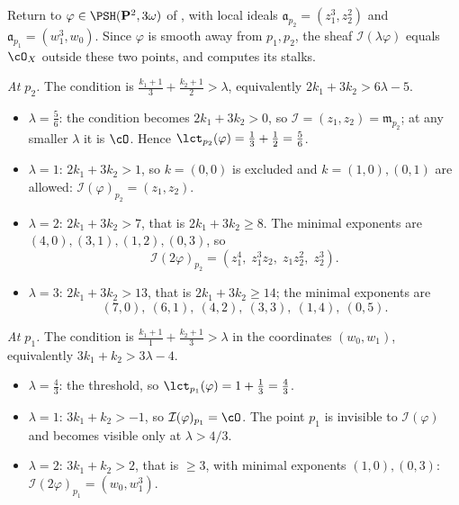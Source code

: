 \begin{example}
\label{ex:ch51-p2-ideals}
Return to \(\varphi\in\PSH(\mathbf P^2,3\omega)\) of
, with local ideals
\(\mathfrak a_{p_2}=(z_1^3,z_2^2)\) and
\(\mathfrak a_{p_1}=(w_1^3,w_0)\).  Since \(\varphi\) is smooth away from
\(p_1,p_2\), the sheaf \(\mathcal I(\lambda\varphi)\) equals \(\cO_X\)
outside these two points, and  computes its stalks.

\emph{At \(p_2\).}  The condition is
\(\frac{k_1+1}{3}+\frac{k_2+1}{2}>\lambda\), equivalently
\(2k_1+3k_2>6\lambda-5\).
\begin{itemize}
\item \(\lambda=\tfrac56\): the condition becomes \(2k_1+3k_2>0\), so
      \(\mathcal I=(z_1,z_2)=\mathfrak m_{p_2}\); at any smaller
      \(\lambda\) it is \(\cO\).  Hence
      \(\lct_{p_2}(\varphi)=\tfrac13+\tfrac12=\tfrac56\).
\item \(\lambda=1\): \(2k_1+3k_2>1\), so \(k=(0,0)\) is excluded and
      \(k=(1,0),(0,1)\) are allowed:
      \(\mathcal I(\varphi)_{p_2}=(z_1,z_2)\).
\item \(\lambda=2\): \(2k_1+3k_2>7\), that is \(2k_1+3k_2\geq8\).  The
      minimal exponents are \((4,0),(3,1),(1,2),(0,3)\), so
      \[
       \mathcal I(2\varphi)_{p_2}
       =(z_1^4,\;z_1^3z_2,\;z_1z_2^2,\;z_2^3).
      \]
\item \(\lambda=3\): \(2k_1+3k_2>13\), that is \(2k_1+3k_2\geq14\); the
      minimal exponents are
      \[
       (7,0),\ (6,1),\ (4,2),\ (3,3),\ (1,4),\ (0,5).
      \]
\end{itemize}

\emph{At \(p_1\).}  The condition is
\(\frac{k_1+1}{1}+\frac{k_2+1}{3}>\lambda\) in the coordinates
\((w_0,w_1)\), equivalently \(3k_1+k_2>3\lambda-4\).
\begin{itemize}
\item \(\lambda=\tfrac43\): the threshold, so
      \(\lct_{p_1}(\varphi)=1+\tfrac13=\tfrac43\).
\item \(\lambda=1\): \(3k_1+k_2>-1\), so
      \(\mathcal I(\varphi)_{p_1}=\cO\).  The point \(p_1\) is invisible
      to \(\mathcal I(\varphi)\) and becomes visible only at
      \(\lambda>4/3\).
\item \(\lambda=2\): \(3k_1+k_2>2\), that is \(\geq3\), with minimal
      exponents \((1,0),(0,3)\):
      \(\mathcal I(2\varphi)_{p_1}=(w_0,w_1^3)\).
\end{itemize}


\end{example}
